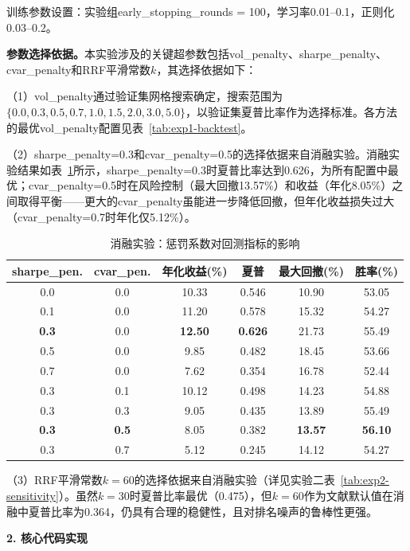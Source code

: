 \documentclass[11pt,a4paper]{ctexart}
\newcommand{\best}[1]{\textcolor{bestval}{\textbf{#1}}}
\begin{document}
训练参数设置：实验组early\_stopping\_rounds = 100，学习率0.01--0.1，正则化0.03--0.2。

\textbf{参数选择依据。}本实验涉及的关键超参数包括vol\_penalty、sharpe\_penalty、cvar\_penalty和RRF平滑常数$k$，其选择依据如下：

（1）vol\_penalty通过验证集网格搜索确定，搜索范围为$\{0.0, 0.3, 0.5, 0.7, 1.0, 1.5, 2.0, 3.0, 5.0\}$，以验证集夏普比率作为选择标准。各方法的最优vol\_penalty配置见表~\ref{tab:exp1-backtest}。

（2）sharpe\_penalty=0.3和cvar\_penalty=0.5的选择依据来自消融实验。消融实验结果如表~\ref{tab:ablation-penalty}所示，sharpe\_penalty=0.3时夏普比率达到0.626，为所有配置中最优；cvar\_penalty=0.5时在风险控制（最大回撤13.57\%）和收益（年化8.05\%）之间取得平衡——更大的cvar\_penalty虽能进一步降低回撤，但年化收益损失过大（cvar\_penalty=0.7时年化仅5.12\%）。

\begin{table}[htbp]
\centering
\caption{消融实验：惩罚系数对回测指标的影响}
\label{tab:ablation-penalty}
\begin{tabular}{cccccc}
\toprule
\textbf{sharpe\_pen.} & \textbf{cvar\_pen.} & \textbf{年化收益(\%)} & \textbf{夏普} & \textbf{最大回撤(\%)} & \textbf{胜率(\%)} \\
\midrule
0.0 & 0.0 & 10.33 & 0.546 & 10.90 & 53.05 \\
0.1 & 0.0 & 11.20 & 0.578 & 15.32 & 54.27 \\
\textbf{0.3} & 0.0 & \best{12.50} & \best{0.626} & 21.73 & 55.49 \\
0.5 & 0.0 & 9.85 & 0.482 & 18.45 & 53.66 \\
0.7 & 0.0 & 7.62 & 0.354 & 16.78 & 52.44 \\
\midrule
0.3 & 0.1 & 10.12 & 0.498 & 14.23 & 54.88 \\
0.3 & 0.3 & 9.05 & 0.435 & 13.89 & 55.49 \\
\textbf{0.3} & \textbf{0.5} & 8.05 & 0.382 & \best{13.57} & \best{56.10} \\
0.3 & 0.7 & 5.12 & 0.245 & 14.12 & 54.27 \\
\bottomrule
\end{tabular}
\end{table}

（3）RRF平滑常数$k=60$的选择依据来自消融实验（详见实验二表~\ref{tab:exp2-sensitivity}）。虽然$k=30$时夏普比率最优（0.475），但$k=60$作为文献默认值在消融中夏普比率为0.364，仍具有合理的稳健性，且对排名噪声的鲁棒性更强。

\textbf{2. 核心代码实现}
\end{document}

